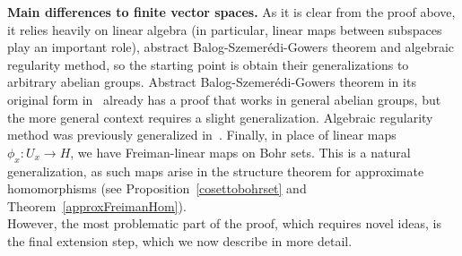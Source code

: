 \documentclass[a4paper,11pt]{article}
\numberwithin{theorem}{section}
\theoremstyle{definition}
\begin{document}
\noindent\textbf{Main differences to finite vector spaces.} As it is clear from the proof above, it relies heavily on linear algebra (in particular, linear maps between subspaces play an important role), abstract Balog-Szemer\'edi-Gowers theorem and algebraic regularity method, so the starting point is obtain their generalizations to arbitrary abelian groups. Abstract Balog-Szemer\'edi-Gowers theorem in its original form in~\cite{newU4} already has a proof that works in general abelian groups, but the more general context requires a slight generalization. Algebraic regularity method was previously generalized in~\cite{generalBilBog}. Finally, in place of linear maps $\phi_x: U_x \to H$, we have Freiman-linear maps on Bohr sets. This is a natural generalization, as such maps arise in the structure theorem for approximate homomorphisms (see Proposition~\ref{cosettobohrset} and Theorem~\ref{approxFreimanHom}).\\
\indent However, the most problematic part of the proof, which requires novel ideas, is the final extension step, which we now describe in more detail.\\
\end{document}
